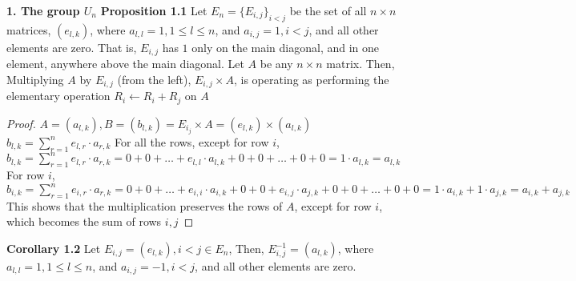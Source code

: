 \documentclass[12pt]{article}
\begin{document}
\textbf{1. The group $U_n$} \newline
\newline
\textbf{Proposition 1.1} \newline
Let $E_n=\{ E_{i,j} \}_{i<j}$ be the set of all $n \times n$ matrices, $(e_{l,k})$, \newline where $a_{l,l}=1,1 \leq l \leq n$, and $a_{i,j}=1,i<j$, and all other elements are zero. That is, $E_{i,j}$ has $1$ only on the main diagonal, and in one element, anywhere above the main diagonal. Let $A$ be any $n \times n$ matrix. Then,\newline
Multiplying $A$ by $E_{i,j}$ (from the left), $E_{i,j} \times A$, is operating as performing the elementary operation $R_i \leftarrow R_i+R_j$ on $A$
\begin{proof}
$A=(a_{l,k}),B=(b_{l,k})=E_{i_j} \times A=(e_{l,k}) \times (a_{l,k})$ \newline
$b_{l,k}=\sum_{r=1}^n e_{l,r} \cdot a_{r,k}$ \newline
For all the rows, except for row $i$, $b_{l,k}=\sum_{r=1}^n e_{l,r} \cdot a_{r,k}=0+0+\dots+e_{l,l} \cdot a_{l,k}+0+0+\dots+0+0=1 \cdot a_{l,k}=a_{l,k}$ \newline
For row $i$, $b_{i,k}=\sum_{r=1}^n e_{i,r} \cdot a_{r,k}=0+0+\dots+e_{i,i} \cdot a_{i,k}+0+0+e_{i,j} \cdot a_{j,k}+0+0+\dots+0+0=1 \cdot a_{i,k}+1 \cdot a_{j,k}=a_{i,k}+a_{j,k}$ \newline
This shows that the multiplication preserves the rows of $A$, except for row $i$, which becomes the sum of rows $i,j$
\end{proof}
\textbf{Corollary 1.2} \newline
Let $E_{i,j}=(e_{l,k}),i<j \in E_n$, Then,\newline
$E_{i,j}^{-1}=(a_{l,k})$, where $a_{l,l}=1,1 \leq l \leq n$, and $a_{i,j}=-1,i<j$, and all other elements are zero.
\end{document}

